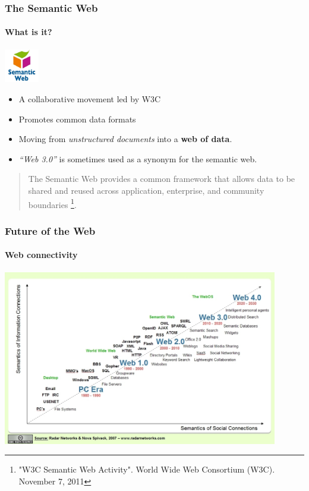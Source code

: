 \documentclass{beamer}
\begin{document}
\begin{frame}
\frametitle{The Semantic Web}
\framesubtitle{What is it?}

\begin{center}
\includegraphics[width=15mm]{images/swlogo.pdf}
\end{center}

\begin{itemize}
\item A collaborative movement led by W3C
\item Promotes common data formats
\item Moving from \emph{unstructured documents} into a \textbf{web of
  data}.
\item \emph{``Web 3.0''} is sometimes used as a synonym for the
  semantic web.
\end{itemize}

\begin{quotation}
The Semantic Web provides a common framework that allows data to be
shared and reused across application, enterprise, and community
boundaries \footnote{"W3C Semantic Web Activity". World Wide Web
  Consortium (W3C). November 7, 2011}.
\end{quotation}

\end{frame}

\begin{frame}
\frametitle{Future of the Web}
\framesubtitle{Web connectivity}

\begin{center}
\includegraphics[width=120mm]{images/web-future.pdf}
\end{center}


\end{frame}
\end{document}
